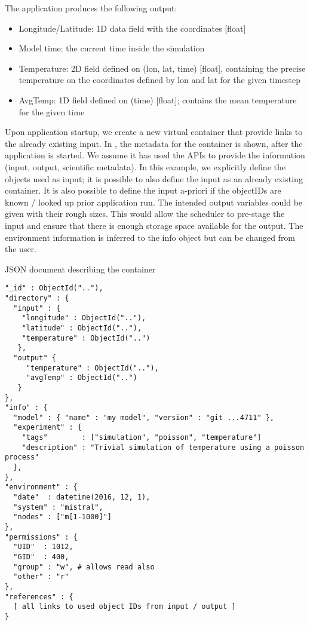 The application produces the following output:
\begin{itemize}
  \item Longitude/Latitude: 1D data field with the coordinates [float]
  \item Model time: the current time inside the simulation
  \item Temperature: 2D field defined on (lon, lat, time) [float], containing the precise temperature on the coordinates defined by lon and lat for the given timestep
  \item AvgTemp: 1D field defined on (time) [float]; contains the mean temperature for the given time
\end{itemize}


Upon application startup, we create a new virtual container that provide links to the already existing input.
In , the metadata for the container is shown, after the application is started.
We assume it has used the APIs to provide the information (input, output, scientific metadata).
In this example, we explicitly define the objects used as input; it is possible to also define
the input as an already existing container.
It is also possible to define the input a-priori if the objectIDs are known / looked up prior application run.
The intended output variables could be given with their rough sizes.
This would allow the scheduler to pre-stage the input and ensure that there is enough storage space available for the output.
The environment information is inferred to the info object but can be changed from the user.

\begin{tcbcode}[label={lst:mongoContainer}]{JSON document describing the container}
\begin{lstlisting}
"_id" : ObjectId(".."),
"directory" : {
  "input" : {
    "longitude" : ObjectId(".."),
    "latitude" : ObjectId(".."),
    "temperature" : ObjectId("..")
   },
  "output" {
     "temperature" : ObjectId(".."),
     "avgTemp" : ObjectId("..")
   }
},
"info" : {
  "model" : { "name" : "my model", "version" : "git ...4711" },
  "experiment" : {
    "tags"        : ["simulation", "poisson", "temperature"]
    "description" : "Trivial simulation of temperature using a poisson process"
  },
},
"environment" : {
  "date"  : datetime(2016, 12, 1),
  "system" : "mistral",
  "nodes" : ["m[1-1000]"]
},
"permissions" : {
  "UID"  : 1012,
  "GID"  : 400,
  "group" : "w", # allows read also
  "other" : "r"
},
"references" : {
  [ all links to used object IDs from input / output ]
}
\end{lstlisting}
\end{tcbcode}


